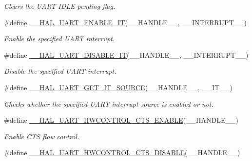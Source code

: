 \begin{DoxyCompactItemize}
\begin{DoxyCompactList}\small\item\em Clears the U\+A\+RT I\+D\+LE pending flag. \end{DoxyCompactList}\item 
\#define \hyperlink{group___u_a_r_t___exported___macros_gaba94165ed584d49c1ec12df9819bd4bb}{\+\_\+\+\_\+\+H\+A\+L\+\_\+\+U\+A\+R\+T\+\_\+\+E\+N\+A\+B\+L\+E\+\_\+\+IT}(\+\_\+\+\_\+\+H\+A\+N\+D\+L\+E\+\_\+\+\_\+,  \+\_\+\+\_\+\+I\+N\+T\+E\+R\+R\+U\+P\+T\+\_\+\+\_\+)
\begin{DoxyCompactList}\small\item\em Enable the specified U\+A\+RT interrupt. \end{DoxyCompactList}\item 
\#define \hyperlink{group___u_a_r_t___exported___macros_ga3c29b33f38658acbf592e9aaf84c6f33}{\+\_\+\+\_\+\+H\+A\+L\+\_\+\+U\+A\+R\+T\+\_\+\+D\+I\+S\+A\+B\+L\+E\+\_\+\+IT}(\+\_\+\+\_\+\+H\+A\+N\+D\+L\+E\+\_\+\+\_\+,  \+\_\+\+\_\+\+I\+N\+T\+E\+R\+R\+U\+P\+T\+\_\+\+\_\+)
\begin{DoxyCompactList}\small\item\em Disable the specified U\+A\+RT interrupt. \end{DoxyCompactList}\item 
\#define \hyperlink{group___u_a_r_t___exported___macros_gab7ad503802bf56bf397c392fc8e18b77}{\+\_\+\+\_\+\+H\+A\+L\+\_\+\+U\+A\+R\+T\+\_\+\+G\+E\+T\+\_\+\+I\+T\+\_\+\+S\+O\+U\+R\+CE}(\+\_\+\+\_\+\+H\+A\+N\+D\+L\+E\+\_\+\+\_\+,  \+\_\+\+\_\+\+I\+T\+\_\+\+\_\+)
\begin{DoxyCompactList}\small\item\em Checks whether the specified U\+A\+RT interrupt source is enabled or not. \end{DoxyCompactList}\item 
\#define \hyperlink{group___u_a_r_t___exported___macros_ga4a77213945844bca4c22ba6a14b7ee4c}{\+\_\+\+\_\+\+H\+A\+L\+\_\+\+U\+A\+R\+T\+\_\+\+H\+W\+C\+O\+N\+T\+R\+O\+L\+\_\+\+C\+T\+S\+\_\+\+E\+N\+A\+B\+LE}(\+\_\+\+\_\+\+H\+A\+N\+D\+L\+E\+\_\+\+\_\+)
\begin{DoxyCompactList}\small\item\em Enable C\+TS flow control. \end{DoxyCompactList}\item 
\#define \hyperlink{group___u_a_r_t___exported___macros_ga0a26cb3a576c2700f76a7c697c86a499}{\+\_\+\+\_\+\+H\+A\+L\+\_\+\+U\+A\+R\+T\+\_\+\+H\+W\+C\+O\+N\+T\+R\+O\+L\+\_\+\+C\+T\+S\+\_\+\+D\+I\+S\+A\+B\+LE}(\+\_\+\+\_\+\+H\+A\+N\+D\+L\+E\+\_\+\+\_\+)

\end{DoxyCompactItemize}

